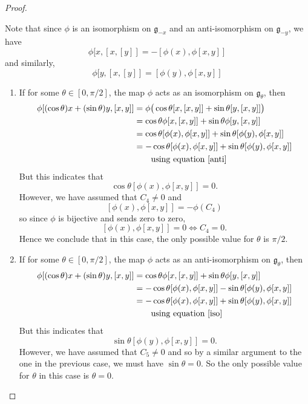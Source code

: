 \documentclass[honours]{UNSWthesis}
\newcommand{\g}{\mathfrak{g}}
\newcommand{\1}{\mathbf{e}_{1}}
\newcommand{\2}{\mathbf{e}_{3}}
\newcommand{\3}{\mathbf{e}_{3}}
\begin{document}
\begin{proof}
\begin{enumerate}
Note that since $\phi$ is an isomorphism on $\g_{-x}$ and an anti-isomorphism on $\g_{-y}$, we have
\begin{equation}\label{anti}
\phi[x,[x,[y]]= -[\phi(x),\phi[x,y]]
\end{equation}
and similarly,
\begin{equation}\label{iso}
\phi[y,[x,[y]]= [\phi(y),\phi[x,y]]
\end{equation}
\begin{enumerate}
\item If for some $\theta \in [0,\pi/2]$, the map $\phi$ acts as an isomorphism on $\g_{\theta}$, then
\begin{align*}
\phi[(\cos{\theta})x + (\sin{\theta})y,[x,y]] &=
\phi\big( \cos{\theta}[x,[x,y]]+ \sin{\theta}[y,[x,y]] \big) \\
&= \cos{\theta}\phi[x,[x,y]]+ \sin{\theta}\phi[y,[x,y]] \\
&= \cos{\theta}[\phi(x),\phi[x,y]]+ \sin{\theta}[\phi(y),\phi[x,y]] \\
&= -\cos{\theta}[\phi(x),\phi[x,y]]+ \sin{\theta}[\phi(y),\phi[x,y]] \\ 
& \quad \quad  \text{using equation \ref{anti}}
\end{align*}
But this indicates that 
\[
\cos{\theta}[\phi(x),\phi[x,y]]=0.
\]
However, we have assumed that $C_4 \neq 0 $ and 
\[
[\phi(x),\phi[x,y]]= -\phi(C_4)
\]
so since $\phi$ is bijective and sends zero to zero, 
\[
[\phi(x),\phi[x,y]]=0 \iff C_4=0.
\]
Hence we conclude that in this case, the only possible value for $\theta$ is $\pi/2$. 


\item If for some $\theta \in [0,\pi/2]$, the map $\phi$ acts as an anti-isomorphism on $\g_{\theta}$, then
\begin{align*}
\phi[(\cos{\theta})x + (\sin{\theta})y,[x,y]] 
&= \cos{\theta}\phi[x,[x,y]]+ \sin{\theta}\phi[y,[x,y]] \\
&= -\cos{\theta}[\phi(x),\phi[x,y]]- \sin{\theta}[\phi(y),\phi[x,y]] \\
&= -\cos{\theta}[\phi(x),\phi[x,y]]+ \sin{\theta}[\phi(y),\phi[x,y]]\\ 
& \quad \quad \text{using equation \ref{iso}}
\end{align*}
But this indicates that 
\[
\sin{\theta}[\phi(y),\phi[x,y]]=0.
\]
However, we have assumed that $C_5 \neq 0 $ and 
so by a similar argument to the one in the previous case, we must have $\sin{\theta}=0$. So the only possible value for $\theta$ in this case is $\theta = 0$.
\end{enumerate}


\end{enumerate}
\end{proof}
\end{document}
